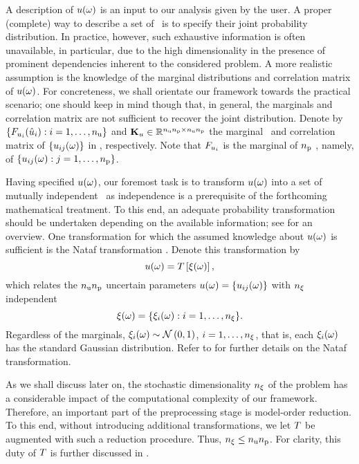 A description of $u(\omega)$ is an input to our analysis given by the user.
A proper (complete) way to describe a set of \rvs\ is to specify their joint probability distribution.
In practice, however, such exhaustive information is often unavailable, in particular, due to the high dimensionality in the presence of prominent dependencies inherent to the considered problem.
A more realistic assumption is the knowledge of the marginal distributions and correlation matrix of $u(\omega)$.
For concreteness, we shall orientate our framework towards the practical scenario; one should keep in mind though that, in general, the marginals and correlation matrix are not sufficient to recover the joint distribution.
Denote by $\{ F_{u_i}(\hat{u}_i): i = 1, \dots, {n_\text{u}} \}$ and $\mathbf{K}_u \in \mathbb{R}^{{n_\text{u}} {n_\text{p}} \times {n_\text{u}} {n_\text{p}}}$ the marginal \cdfs\ and correlation matrix of $\{ u_{ij}(\omega) \}$ in , respectively.
Note that $F_{u_i}$ is the marginal of ${n_\text{p}}$ \rvs, namely, of $\{ u_{ij}(\omega): j = 1, \dots, {n_\text{p}} \}$.

Having specified $u(\omega)$, our foremost task is to transform $u(\omega)$ into a set of mutually independent \rvs\ as independence is a prerequisite of the forthcoming mathematical treatment.
To this end, an adequate probability transformation should be undertaken depending on the available information; see \cite{eldred2008} for an overview.
One transformation for which the assumed knowledge about $u(\omega)$ is sufficient is the Nataf transformation \cite{li2008}.
Denote this transformation by
\begin{equation} \elab{probability-transformation}
  \u(\o) = \oTransform{\z(\o)},
\end{equation}
which relates the ${n_\text{u}} {n_\text{p}}$ uncertain parameters $u(\omega) = \{ u_{ij}(\omega) \}$ with ${n_\xi}$ independent \rvs
\begin{equation} \elab{independent-random-variables}
  \z(\o) = \{ \z_i(\o): i = 1, \dots, \nvars \}.
\end{equation}
Regardless of the marginals, $\xi_i(\omega) \sim \mathcal{N}\left( 0, 1 \right)$, $i = 1, \dots, {n_\xi}$, that is, each $\xi_i(\omega)$ has the standard Gaussian distribution.
Refer to  for further details on the Nataf transformation.

As we shall discuss later on, the stochastic dimensionality ${n_\xi}$ of the problem has a considerable impact of the computational complexity of our framework.
Therefore, an important part of the preprocessing stage is model-order reduction.
To this end, without introducing additional transformations, we let $\oTransform$ be augmented with such a reduction procedure.
Thus, ${n_\xi} \leq {n_\text{u}} {n_\text{p}}$.
For clarity, this duty of $\oTransform$ is further discussed in .

